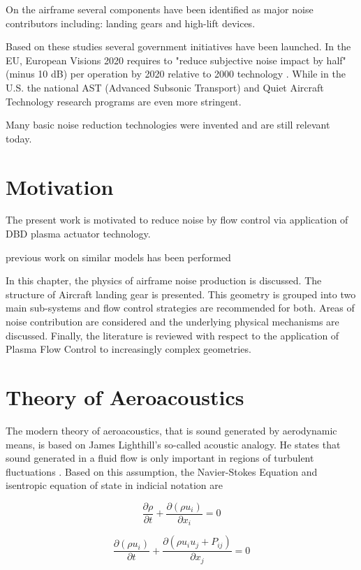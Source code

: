On the airframe several components have been identified as major noise contributors including: landing gears and high-lift devices. 

Based on these studies several government initiatives have been launched. In the EU, European Visions 2020 requires to "reduce subjective noise impact by half" (minus 10 dB) per operation by 2020 relative to 2000 technology \cite{busquin2001}. While in the U.S. the national AST (Advanced Subsonic Transport) and Quiet Aircraft Technology research programs are even more stringent. 

Many basic noise reduction technologies were invented and are still relevant today.

\section{Motivation}
The present work is motivated to reduce noise by flow control via application of DBD plasma actuator technology.

previous work on similar models has been performed

In this chapter, the physics of airframe noise production is discussed. The structure of Aircraft landing gear is presented. This geometry is grouped into two main sub-systems and flow control strategies are recommended for both. Areas of noise contribution are considered and the underlying physical mechanisms are discussed. Finally, the literature is reviewed with respect to the application of Plasma Flow Control to increasingly complex geometries.

\section{Theory of Aeroacoustics}
The modern theory of aeroacoustics, that is sound generated by aerodynamic means, is based on James Lighthill's so-called acoustic analogy. He states that sound generated in a fluid flow is only important in regions of turbulent fluctuations \cite{howe2003}. Based on this assumption, the Navier-Stokes Equation and isentropic equation of state in indicial notation are

\begin{equation} \label{eq:1-1}
	\frac{\partial \rho}{\partial t} + \frac{\partial(\rho u_i)}{\partial x_i} = 0
\end{equation}

	\begin{equation} \label{eq:1-2}
		\frac{\partial (\rho u_i)}{\partial t} + \frac{\partial(\rho u_i u_j + P_{ij})}{\partial x_j} = 0
	\end{equation}

